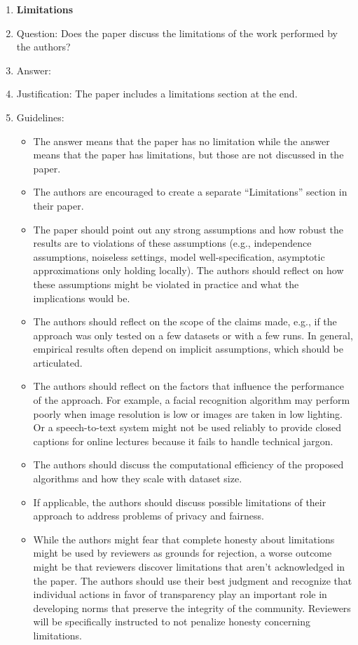 \documentclass{article}
\begin{document}
\begin{enumerate}
\item {\bf Limitations}
    \item[] Question: Does the paper discuss the limitations of the work performed by the authors?
    \item[] Answer: \answerYes{} %
    \item[] Justification: The paper includes a limitations section at the end.
    \item[] Guidelines:
    \begin{itemize}
        \item The answer \answerNA{} means that the paper has no limitation while the answer \answerNo{} means that the paper has limitations, but those are not discussed in the paper. 
        \item The authors are encouraged to create a separate ``Limitations'' section in their paper.
        \item The paper should point out any strong assumptions and how robust the results are to violations of these assumptions (e.g., independence assumptions, noiseless settings, model well-specification, asymptotic approximations only holding locally). The authors should reflect on how these assumptions might be violated in practice and what the implications would be.
        \item The authors should reflect on the scope of the claims made, e.g., if the approach was only tested on a few datasets or with a few runs. In general, empirical results often depend on implicit assumptions, which should be articulated.
        \item The authors should reflect on the factors that influence the performance of the approach. For example, a facial recognition algorithm may perform poorly when image resolution is low or images are taken in low lighting. Or a speech-to-text system might not be used reliably to provide closed captions for online lectures because it fails to handle technical jargon.
        \item The authors should discuss the computational efficiency of the proposed algorithms and how they scale with dataset size.
        \item If applicable, the authors should discuss possible limitations of their approach to address problems of privacy and fairness.
        \item While the authors might fear that complete honesty about limitations might be used by reviewers as grounds for rejection, a worse outcome might be that reviewers discover limitations that aren't acknowledged in the paper. The authors should use their best judgment and recognize that individual actions in favor of transparency play an important role in developing norms that preserve the integrity of the community. Reviewers will be specifically instructed to not penalize honesty concerning limitations.
    \end{itemize}


\end{enumerate}
\end{document}
